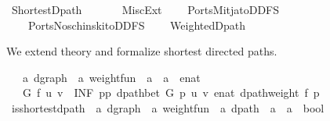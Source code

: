 %
\begin{isabellebody}%
%
%
\isadelimtheory
%
\endisadelimtheory
%
\isatagtheory
{}\isamarkupfalse%
\ Shortest{\isacharunderscore}{\kern0pt}Dpath\isanewline
\ \ \isanewline
\ \ \ \ {\isachardoublequoteopen}{\isachardot}{\kern0pt}{\isachardot}{\kern0pt}{\isacharslash}{\kern0pt}{\isachardot}{\kern0pt}{\isachardot}{\kern0pt}{\isacharslash}{\kern0pt}Misc{\isacharunderscore}{\kern0pt}Ext{\isachardoublequoteclose}\isanewline
\ \ \ \ Ports{\isachardot}{\kern0pt}Mitja{\isacharunderscore}{\kern0pt}to{\isacharunderscore}{\kern0pt}DDFS\isanewline
\ \ \ \ Ports{\isachardot}{\kern0pt}Noschinski{\isacharunderscore}{\kern0pt}to{\isacharunderscore}{\kern0pt}DDFS\isanewline
\ \ \ \ Weighted{\isacharunderscore}{\kern0pt}Dpath\isanewline
{}%
\endisatagtheory
{\isafoldtheory}%
%
\isadelimtheory
%
\endisadelimtheory
%
\begin{isamarkuptext}%
We extend theory  and formalize shortest directed paths.%
\end{isamarkuptext}\isamarkuptrue%
\isamarkupfalse%
\ {\isasymdelta}\ {\isacharcolon}{\kern0pt}{\isacharcolon}{\kern0pt}\ {\isachardoublequoteopen}{\isacharprime}{\kern0pt}a\ dgraph\ {\isasymRightarrow}\ {\isacharprime}{\kern0pt}a\ weight{\isacharunderscore}{\kern0pt}fun\ {\isasymRightarrow}\ {\isacharprime}{\kern0pt}a\ {\isasymRightarrow}\ {\isacharprime}{\kern0pt}a\ {\isasymRightarrow}\ enat{\isachardoublequoteclose}\ \isanewline
\ \ {\isachardoublequoteopen}{\isasymdelta}\ G\ f\ u\ v\ {\isasymequiv}\ INF\ p{\isasymin}{\isacharbraceleft}{\kern0pt}p{\isachardot}{\kern0pt}\ dpath{\isacharunderscore}{\kern0pt}bet\ G\ p\ u\ v{\isacharbraceright}{\kern0pt}{\isachardot}{\kern0pt}\ enat\ {\isacharparenleft}{\kern0pt}dpath{\isacharunderscore}{\kern0pt}weight\ f\ p{\isacharparenright}{\kern0pt}{\isachardoublequoteclose}\isanewline
\isanewline
{}\isamarkupfalse%
\ is{\isacharunderscore}{\kern0pt}shortest{\isacharunderscore}{\kern0pt}dpath\ {\isacharcolon}{\kern0pt}{\isacharcolon}{\kern0pt}\ {\isachardoublequoteopen}{\isacharprime}{\kern0pt}a\ dgraph\ {\isasymRightarrow}\ {\isacharprime}{\kern0pt}a\ weight{\isacharunderscore}{\kern0pt}fun\ {\isasymRightarrow}\ {\isacharprime}{\kern0pt}a\ dpath\ {\isasymRightarrow}\ {\isacharprime}{\kern0pt}a\ {\isasymRightarrow}\ {\isacharprime}{\kern0pt}a\ {\isasymRightarrow}\ bool{\isachardoublequoteclose}\ \isanewline

\end{isabellebody}
